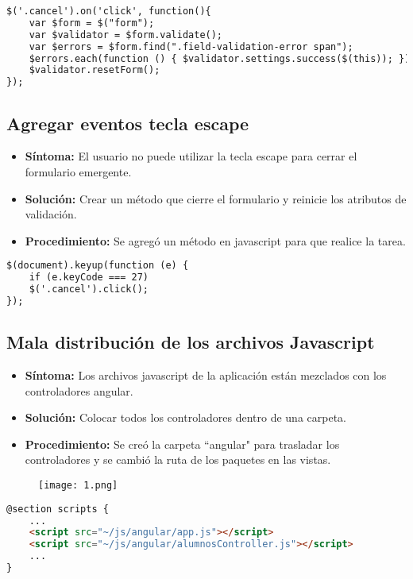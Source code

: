 \begin{lstlisting}[language=html]
$('.cancel').on('click', function(){
	var $form = $("form");
	var $validator = $form.validate();
	var $errors = $form.find(".field-validation-error span");
	$errors.each(function () { $validator.settings.success($(this)); })
	$validator.resetForm();
});
\end{lstlisting}

\subsection{Agregar eventos tecla escape}
\begin{itemize}
	\item \textbf{Síntoma:} El usuario no puede utilizar la tecla escape para cerrar el formulario emergente.
	\item \textbf{Solución:} Crear un método que cierre el formulario y reinicie los atributos de validación.
	\item \textbf{Procedimiento:} Se agregó un método en javascript para que realice la tarea.
\end{itemize}

\begin{lstlisting}[language=html]
$(document).keyup(function (e) {
	if (e.keyCode === 27)
	$('.cancel').click();
});
\end{lstlisting}

\subsection{Mala distribución de los archivos Javascript}
\begin{itemize}
	\item \textbf{Síntoma:} Los archivos javascript de la aplicación están mezclados con los controladores angular.
	\item \textbf{Solución:} Colocar todos los controladores dentro de una carpeta.
	\item \textbf{Procedimiento:} Se creó la carpeta ``angular" para trasladar los controladores y se cambió la ruta de los paquetes en las vistas.
\end{itemize}

\begin{figure}[h]
	\texttt{[image: 1.png]}
	\centering
\end{figure}

\begin{lstlisting}[language=html]
@section scripts {
	...
	<script src="~/js/angular/app.js"></script>
	<script src="~/js/angular/alumnosController.js"></script>
	...
}
\end{lstlisting}


